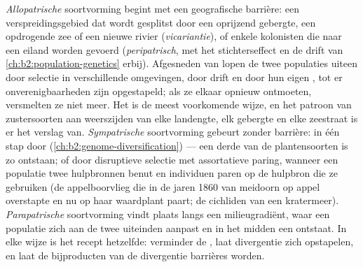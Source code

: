 \begin{proposition}\label{prop:b2:speciation:modes}
\emph{Allopatrische} soortvorming begint met een geografische barrière:
een verspreidingsgebied dat wordt gesplitst door een oprijzend gebergte, een
opdrogende zee of een nieuwe rivier (\emph{vicariantie}), of enkele kolonisten
die naar een eiland worden gevoerd (\emph{peripatrisch}, met het stichterseffect
en de drift van \cref{ch:b2:population-genetics} erbij). Afgesneden van
 lopen de twee populaties uiteen door selectie in verschillende
omgevingen, door drift en door hun eigen , tot er onverenigbaarheden
zijn opgestapeld; als ze elkaar opnieuw ontmoeten, versmelten ze niet meer. Het
is de meest voorkomende wijze, en het patroon van zustersoorten aan weerszijden
van elke landengte, elk gebergte en elke zeestraat is er het verslag van.
\emph{Sympatrische} soortvorming gebeurt zonder barrière: in één stap
door  (\cref{ch:b2:genome-diversification}) --- een derde van de
plantensoorten is zo ontstaan; of door disruptieve selectie met
assortatieve paring, wanneer een populatie twee hulpbronnen benut en
individuen paren op de hulpbron die ze gebruiken (de appelboorvlieg die in de
jaren 1860 van meidoorn op appel overstapte en nu op haar waardplant paart; de
cichliden van een kratermeer). \emph{Parapatrische}
soortvorming vindt plaats langs een milieugradiënt, waar een
populatie zich aan de twee uiteinden aanpast en in het midden een
 ontstaat. In elke wijze is het recept hetzelfde: verminder de
, laat divergentie zich opstapelen, en laat de bijproducten van de
divergentie barrières worden.
\end{proposition}

